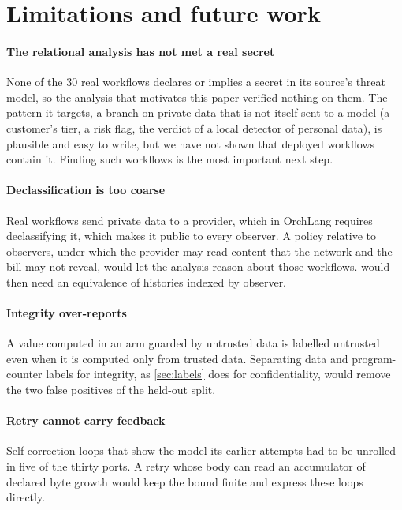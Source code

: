 \section{Limitations and future work}\label{sec:conclusion}

\paragraph{The relational analysis has not met a real secret} None of the 30 real
workflows declares or implies a secret in its source's threat model, so the analysis
that motivates this paper verified nothing on them. The pattern it targets, a branch on
private data that is not itself sent to a model (a customer's tier, a risk flag, the
verdict of a local detector of personal data), is plausible and easy to write, but we
have not shown that deployed workflows contain it. Finding such workflows is the most
important next step.

\paragraph{Declassification is too coarse} Real workflows send private data to a
provider, which in OrchLang requires declassifying it, which makes it public to every
observer. A policy relative to observers, under which the provider may read content
that the network and the bill may not reveal, would let the analysis reason about those
workflows.  would then need an equivalence of histories indexed
by observer.

\paragraph{Integrity over-reports} A value computed in an arm guarded by untrusted data
is labelled untrusted even when it is computed only from trusted data. Separating data
and program-counter labels for integrity, as \cref{sec:labels} does for confidentiality,
would remove the two false positives of the held-out split.

\paragraph{Retry cannot carry feedback} Self-correction loops that show the model its
earlier attempts had to be unrolled in five of the thirty ports. A retry whose body can
read an accumulator of declared byte growth would keep the bound finite and express
these loops directly.

